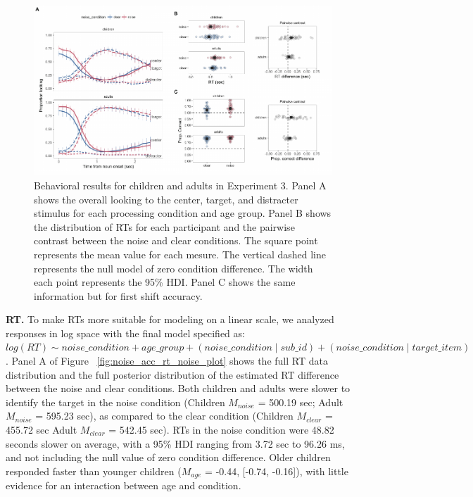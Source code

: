 \documentclass[english,floatsintext,man]{apa6}
\theoremstyle{definition}
\theoremstyle{definition}
\theoremstyle{definition}
\theoremstyle{remark}
\begin{document}
\begin{figure}[H]

{\centering \includegraphics[width=0.95\linewidth]{figs/noise-acc-rt-1} 

}

\caption{Behavioral results for children and adults in Experiment 3. Panel A shows the overall looking to the center, target, and distracter stimulus for each processing condition and age group. Panel B shows the distribution of RTs for each participant and the pairwise contrast between the noise and clear conditions. The square point represents the mean value for each mesure. The vertical dashed line represents the null model of zero condition difference. The width each point represents the 95\% HDI. Panel C shows the same information but for first shift accuracy.}\label{fig:noise-acc-rt}
\end{figure}

\textbf{RT.} To make RTs more suitable for modeling on a linear scale,
we analyzed responses in log space with the final model specified as:
\texttt{$log(RT) \sim noise\_condition + age\_group + (noise\_condition \mid sub\_id ) + (noise\_condition \mid target\_item)$}.
Panel A of Figure ~\ref{fig:noise_acc_rt_noise_plot} shows the full RT
data distribution and the full posterior distribution of the estimated
RT difference between the noise and clear conditions. Both children and
adults were slower to identify the target in the noise condition
(Children \(M_{noise}\) = 500.19 sec; Adult \(M_{noise}\) = 595.23 sec),
as compared to the clear condition (Children \(M_{clear}\) = 455.72 sec
Adult \(M_{clear}\) = 542.45 sec). RTs in the noise condition were 48.82
seconds slower on average, with a 95\% HDI ranging from 3.72 sec to
96.26 ms, and not including the null value of zero condition difference.
Older children responded faster than younger children (\(M_{age}\) =
-0.44, {[}-0.74, -0.16{]}), with little evidence for an interaction
between age and condition.
\end{document}
